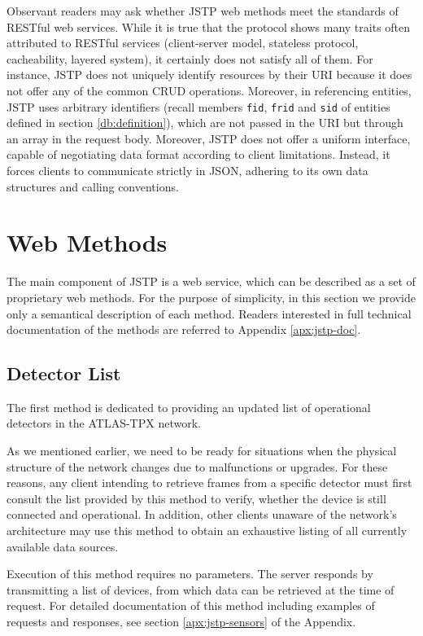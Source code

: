 Observant readers may ask whether JSTP web methods meet the standards of RESTful web services. While it is true that the protocol shows many traits often attributed to RESTful services (client-server model, stateless protocol, cacheability, layered system), it certainly does not satisfy all of them. For instance, JSTP does not uniquely identify resources by their URI because it does not offer any of the common CRUD operations. Moreover, in referencing entities, JSTP uses arbitrary identifiers (recall members \texttt{fid}, \texttt{frid} and \texttt{sid} of entities defined in section \ref{db:definition}), which are not passed in the URI but through an array in the request body. Moreover, JSTP does not offer a uniform interface, capable of negotiating data format according to client limitations. Instead, it forces clients to communicate strictly in JSON, adhering to its own data structures and calling conventions.

\section{Web Methods}
The main component of JSTP is a web service, which can be described as a set of proprietary web methods. For the purpose of simplicity, in this section we provide only a semantical description of each method. Readers interested in full technical documentation of the methods are referred to Appendix \ref{apx:jstp-doc}.

\subsection{Detector List}
The first method is dedicated to providing an updated list of operational detectors in the ATLAS-TPX network.

As we mentioned earlier, we need to be ready for situations when the physical structure of the network changes due to malfunctions or upgrades. For these reasons, any client intending to retrieve frames from a specific detector must first consult the list provided by this method to verify, whether the device is still connected and operational. In addition, other clients unaware of the network's architecture may use this method to obtain an exhaustive listing of all currently available data sources.

Execution of this method requires no parameters. The server responds by transmitting a list of devices, from which data can be retrieved at the time of request. For detailed documentation of this method including examples of requests and responses, see section \ref{apx:jstp-sensors} of the Appendix.

